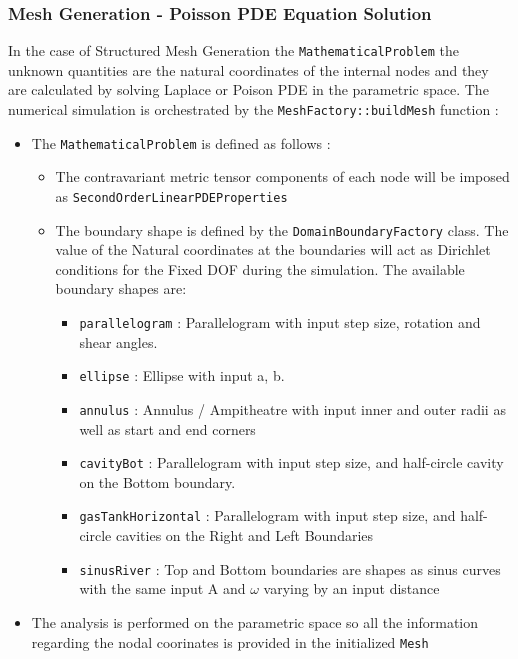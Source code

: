 \documentclass{article}
\begin{document}
	\subsubsection{Mesh Generation - Poisson PDE Equation Solution}
	
	 In the case of Structured Mesh Generation the \texttt{MathematicalProblem} the unknown quantities are the natural coordinates of the internal nodes and they are calculated by solving Laplace or Poison PDE in the parametric space. The numerical simulation is orchestrated by the \texttt{MeshFactory::buildMesh} function : 
 	\begin{itemize}
 		\item The \texttt{MathematicalProblem} is defined as follows :
 			\begin{itemize}
 				\item The contravariant metric tensor components of each node will be imposed as \newline \texttt{SecondOrderLinearPDEProperties}
 				\item The boundary shape is defined by the \texttt{DomainBoundaryFactory} class. The value of the Natural coordinates at the boundaries will act as Dirichlet conditions for the Fixed DOF during the simulation. The available boundary shapes are: 
 			\begin{itemize}
 				\item \texttt{parallelogram} : Parallelogram with input step size, rotation and shear angles.
 				\item \texttt{ellipse} : Ellipse with input a, b.
 				\item \texttt{annulus} : Annulus / Ampitheatre with input inner and outer radii as well as start and end corners
 				\item \texttt{cavityBot} : Parallelogram with input step size, and half-circle cavity on the Bottom boundary.
 				\item \texttt{gasTankHorizontal} : Parallelogram with input step size, and half-circle cavities on the Right and Left Boundaries
 				\item \texttt{sinusRiver} : Top and Bottom boundaries are shapes as sinus curves with the same input A and $\omega$ varying 	by an input distance
 			\end{itemize}
 	\end{itemize}	
 			\item The analysis is performed on the parametric space so all the information regarding the nodal coorinates is provided in the initialized \texttt{Mesh}
 			

\end{itemize}
\end{document}
